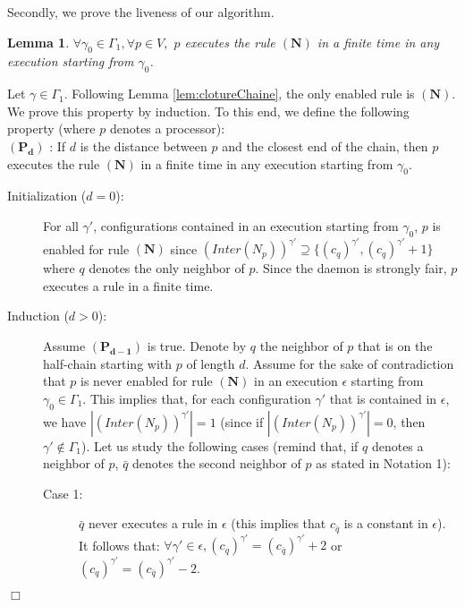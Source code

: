 \documentclass[11pt,english,letterpaper]{article}
\newtheorem{lemma}{Lemma}
\newenvironment{proof}{{\noindent\bf Proof. } }{{\hfill $\Box$}}
\begin{document}
Secondly, we prove the liveness of our algorithm.

\begin{lemma}\label{lem:prelemVivaciteChaine}
$\forall\gamma_{0}\in\Gamma_{1},\forall p\in V,$ $p$ executes the rule $\boldsymbol{(N)}$ in a finite time in any execution starting from $\gamma_{0}$.
\end{lemma}

\begin{proof}
Let $\gamma\in\Gamma_{1}$. Following Lemma \ref{lem:clotureChaine}, the only  enabled rule is $\boldsymbol{(N)}$. We prove this property by induction. To this end, we define the following property (where $p$ denotes a processor):\\
$\boldsymbol{(P_{d})}$ : If $d$ is the distance between $p$ and the closest end of the chain, then $p$ executes the rule $\boldsymbol{(N)}$ in a finite time	in any execution starting from $\gamma_{0}$.

\begin{description}
\item[Initialization ($d=0$):] For all $\gamma'$, configurations contained in an execution starting from $\gamma_{0}$, $p$ is enabled for rule $\boldsymbol{(N)}$ since $\left(Inter(N_{p})\right)^{\gamma'}\supseteq\{\left(c_{q}\right)^{\gamma'},\left(c_{q}\right)^{\gamma'}+1\}$ where $q$ denotes the only neighbor of $p$.	Since the daemon is strongly fair, $p$ executes a rule in a finite time.

\item[Induction ($d>0$):] Assume $\boldsymbol{(P_{d-1})}$ is true. Denote by $q$ the neighbor of $p$ that is on the half-chain starting with $p$ of length $d$. Assume for the sake of contradiction that $p$ is never enabled for rule $\boldsymbol{(N)}$ in an execution $\epsilon$ starting from $\gamma_{0}\in\Gamma_{1}$. This implies that, for each configuration $\gamma'$ that is contained in $\epsilon$, we have $|\left(Inter(N_{p})\right)^{\gamma'}|=1$ (since if $|\left(Inter(N_{p})\right)^{\gamma'}|=0$, then $\gamma'\notin\Gamma_{1}$). Let us study the following cases (remind that, if $q$ denotes a neighbor of $p$, $\bar{q}$ denotes the second neighbor of $p$ as stated in Notation 1):

\begin{description}
\item[Case 1:] $\bar{q}$ never executes a rule in $\epsilon$ (this implies that $c_{\bar{q}}$ is a constant in $\epsilon$).\\
It follows that: $\forall\gamma'\in\epsilon, \left(c_{q}\right)^{\gamma'}=\left(c_{\bar{q}}\right)^{\gamma'}+2$ or	$\left(c_{q}\right)^{\gamma'}=\left(c_{\bar{q}}\right)^{\gamma'}-2$.


\end{description}
\end{description}
\end{proof}
\end{document}
